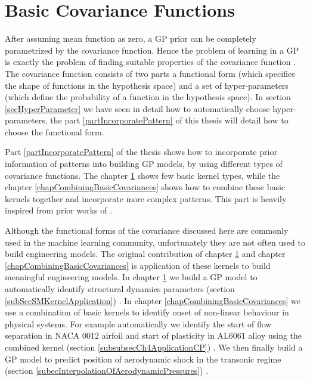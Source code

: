 \chapter{Basic Covariance Functions}
\label{chapBasicCovarianceKernels}

After assuming mean function as zero, a GP prior can be completely parametrized by the covariance function. Hence the problem of learning in a GP is exactly the problem of finding suitable properties of the covariance function \cite{rasmussen2006gaussian}. The covariance function consists of two parts a functional form (which specifies the shape of functions in the hypothesis space) and a set of hyper-parameters (which define the probability of a function in the hypothesis space). In section \ref{secHyperParameter} we have seen in detail how to automatically choose hyper-parameters, the part \ref{partIncorporatePattern} of this thesis will detail how to choose the functional form. 

Part \ref{partIncorporatePattern} of the thesis shows how to incorporate prior information of patterns into building GP models, by using different types of covariance functions. The chapter \ref{chapBasicCovarianceKernels} shows few basic kernel types, while the chapter \ref{chapCombiningBasicCovariances} shows how to combine these basic kernels together and incorporate more complex patterns. This part is heavily inspired from prior works of \cite{duvenaud-thesis-2014, wilson2014thesis, lloyd2014automatic, durrande2001etude}. 

Although the functional forms of the covariance discussed here are commonly used in the machine learning community, unfortunately they are not often used to build engineering models. The original contribution of chapter \ref{chapBasicCovarianceKernels} and chapter \ref{chapCombiningBasicCovariances} is application of these kernels to build meaningful engineering models. In chapter \ref{chapBasicCovarianceKernels} we build a GP model to automatically identify structural dynamics parameters (section \ref{subSecSMKernelApplication}) \cite{chiplunkar2017operational}. In chapter \ref{chapCombiningBasicCovariances} we use a combination of basic kernels to identify onset of non-linear behaviour in physical systems. For example automatically we identify the start of flow separation in NACA 0012 airfoil and start of plasticity in AL6061 alloy using the combined kernel (section \ref{subsubsecCh4ApplicationCP}) \cite{chiplunkar:hal-01555401}. We then finally build a GP model to predict position of aerodynamic shock in the transonic regime (section \ref{subecInterpolationOfAerodynamicPressures}) \cite{oatao18004}. 
  
